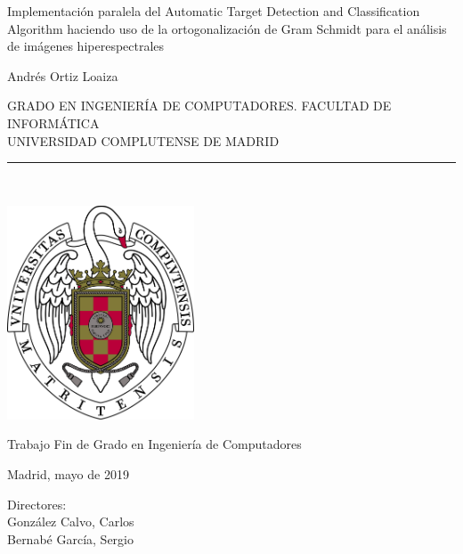 \newpage


\thispagestyle{empty}


\begin{center}

    \vspace{1cm}


    {\Large Implementación paralela del Automatic Target Detection and Classification Algorithm haciendo uso de la ortogonalización de Gram Schmidt
    para el análisis de imágenes hiperespectrales}\\

    \vspace{1.5cm}

    {\large Andrés Ortiz Loaiza}\\

    \vspace{1.5cm}

    GRADO EN INGENIERÍA DE COMPUTADORES. FACULTAD DE INFORMÁTICA\\
    UNIVERSIDAD COMPLUTENSE DE MADRID \\


    \vspace{0.65cm}
    \rule{2in}{0.5pt}\\
    \vspace{0.85cm}

    \includegraphics[height=2.5in]{images/ucm/shield2.jpg}

    \vspace{0.5cm}
    Trabajo Fin de Grado en Ingeniería de Computadores

    \vspace{0.5cm}

    Madrid, mayo de 2019\\
    \vspace{3cm}

\end{center}

{\raggedleft
    Directores:\\
    \vspace{ 0.5cm}
    González Calvo, Carlos\\
    Bernabé García, Sergio\\
}